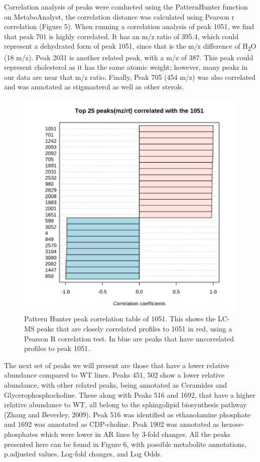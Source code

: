 \documentclass{bioinfo}
\begin{document}
Correlation analysis of peaks were conducted using the PatternHunter
function on MetaboAnalyst, the correlation distance was calculated using
Pearson r correlation (Figure 5). When running a correlation analysis of
peak 1051, we find that peak 701 is highly correlated. It has an m/z
ratio of 395.4, which could represent a dehydrated form of peak 1051,
since that is the m/z difference of H\textsubscript{2}O (18 m/z). Peak
2031 is another related peak, with a m/z of 387. This peak could
represent cholesterol as it has the same atomic weight; however, many
peaks in our data are near that m/z ratio. Finally, Peak 705 (454 m/z)
was also correlated and was annotated as stigmasterol as well as other
sterols.\\

\begin{figure}
\includegraphics[width=1\linewidth]{1051 correlation table} \caption{Pattern Hunter peak correlation table of 1051. This shows the LC-MS peaks that are closely correlated profiles to 1051 in red, using a Pearson R correlation test. In blue are peaks that have uncorrelated profiles to peak 1051.}\label{fig:figure3}
\end{figure}

The next set of peaks we will present are those that have a lower
relative abundance compared to WT lines. Peaks 451, 502 show a lower
relative abundance, with other related peaks, being annotated as
Ceramides and Glycerophosphocholine. These along with Peaks 516 and
1692, that have a higher relative abundance to WT, all belong to the
sphingolipid biosynthesis pathway (Zhang and Beverley, 2009). Peak 516
was identified as ethanolamine phosphate and 1692 was annotated as
CDP-choline. Peak 1902 was annotated as hexose-phosphates which were
lower in AR lines by 3-fold changes. All the peaks presented here can be
found in Figure 6, with possible metabolite annotations, p.adjusted
values, Log-fold changes, and Log Odds.
\end{document}
